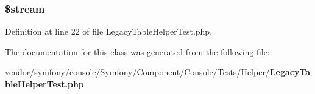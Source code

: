 \subsubsection[{\$stream}]{\setlength{\rightskip}{0pt plus 5cm}\${\bf stream}\hspace{0.3cm}{\ttfamily [protected]}}\label{class_symfony_1_1_component_1_1_console_1_1_tests_1_1_helper_1_1_legacy_table_helper_test_aa658946a5d6cb700e35df1fc7854e7b3}


Definition at line 22 of file Legacy\+Table\+Helper\+Test.\+php.



The documentation for this class was generated from the following file\+:\begin{DoxyCompactItemize}
\item 
vendor/symfony/console/\+Symfony/\+Component/\+Console/\+Tests/\+Helper/{\bf Legacy\+Table\+Helper\+Test.\+php}\end{DoxyCompactItemize}
